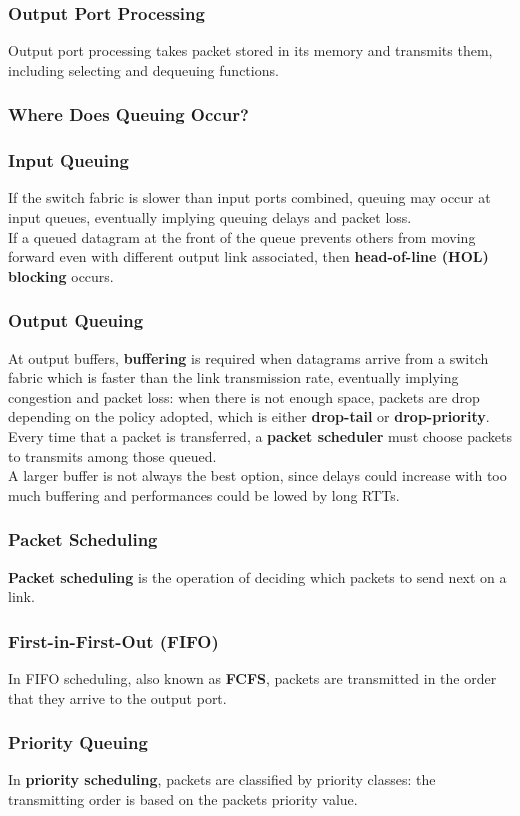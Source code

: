 \documentclass{article}
\begin{document}
\subsubsection{Output Port Processing}
Output port processing takes packet stored in its memory and transmits them, including selecting and dequeuing functions.
\subsubsection{Where Does Queuing Occur?}
\subsubsection*{Input Queuing}
If the switch fabric is slower than input ports combined, queuing may occur at input queues, eventually implying queuing delays and packet loss. \\ If a queued datagram at the front of the queue prevents others from moving forward even with different output link associated, then \textbf{head-of-line (HOL) blocking} occurs. 
\subsubsection*{Output Queuing}
At output buffers, \textbf{buffering} is required when datagrams arrive from a switch fabric which is faster than the link transmission rate, eventually implying congestion and packet loss: when there is not enough space, packets are drop depending on the policy adopted, which is either \textbf{drop-tail} or \textbf{drop-priority}. \\ Every time that a packet is transferred, a \textbf{packet scheduler} must choose packets to transmits among those queued. \\ A larger buffer is not always the best option, since delays could increase with too much buffering and performances could be lowed by long RTTs.
\subsubsection{Packet Scheduling}
\textbf{Packet scheduling} is the operation of deciding which packets to send next on a link.
\subsubsection*{First-in-First-Out (FIFO)}
In FIFO scheduling, also known as \textbf{FCFS}, packets are transmitted in the order that they arrive to the output port.
\subsubsection*{Priority Queuing}
In \textbf{priority scheduling}, packets are classified by priority classes: the transmitting order is based on the packets priority value.
\end{document}
